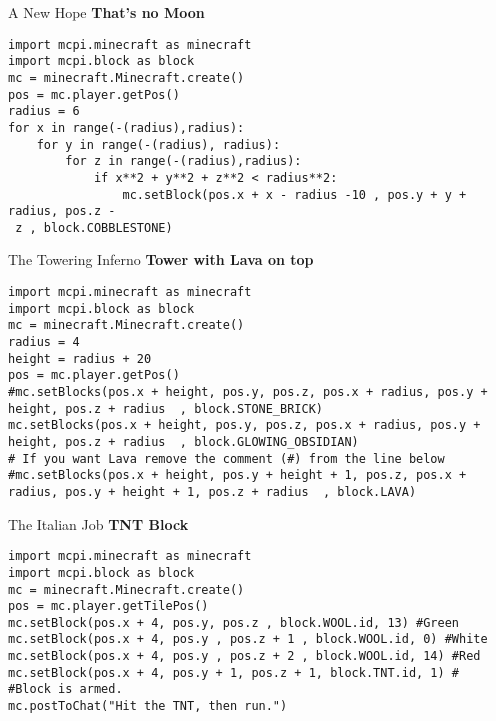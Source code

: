 \documentclass[flashcard_land,grid]{flashcards}
\begin{document}
\begin{flashcard}[API]{A New Hope}
{\bf That's no Moon}
\begin{lstlisting}
import mcpi.minecraft as minecraft
import mcpi.block as block
mc = minecraft.Minecraft.create()
pos = mc.player.getPos()
radius = 6
for x in range(-(radius),radius):
    for y in range(-(radius), radius):
        for z in range(-(radius),radius):
            if x**2 + y**2 + z**2 < radius**2:
                mc.setBlock(pos.x + x - radius -10 , pos.y + y + radius, pos.z -
 z , block.COBBLESTONE)
\end{lstlisting}
\end{flashcard}


\begin{flashcard}[API]{The Towering Inferno}
{\bf Tower with Lava on top}
\begin{lstlisting}
import mcpi.minecraft as minecraft
import mcpi.block as block
mc = minecraft.Minecraft.create()
radius = 4
height = radius + 20 
pos = mc.player.getPos()
#mc.setBlocks(pos.x + height, pos.y, pos.z, pos.x + radius, pos.y + height, pos.z + radius  , block.STONE_BRICK)
mc.setBlocks(pos.x + height, pos.y, pos.z, pos.x + radius, pos.y + height, pos.z + radius  , block.GLOWING_OBSIDIAN)
# If you want Lava remove the comment (#) from the line below
#mc.setBlocks(pos.x + height, pos.y + height + 1, pos.z, pos.x + radius, pos.y + height + 1, pos.z + radius  , block.LAVA) 
\end{lstlisting}
\end{flashcard}


\begin{flashcard}[API]{The Italian Job}
{\bf TNT Block }
\begin{lstlisting}
import mcpi.minecraft as minecraft
import mcpi.block as block
mc = minecraft.Minecraft.create()
pos = mc.player.getTilePos()
mc.setBlock(pos.x + 4, pos.y, pos.z , block.WOOL.id, 13) #Green
mc.setBlock(pos.x + 4, pos.y , pos.z + 1 , block.WOOL.id, 0) #White
mc.setBlock(pos.x + 4, pos.y , pos.z + 2 , block.WOOL.id, 14) #Red
mc.setBlock(pos.x + 4, pos.y + 1, pos.z + 1, block.TNT.id, 1) #
#Block is armed.
mc.postToChat("Hit the TNT, then run.")
\end{lstlisting}
\end{flashcard}
\end{document}
